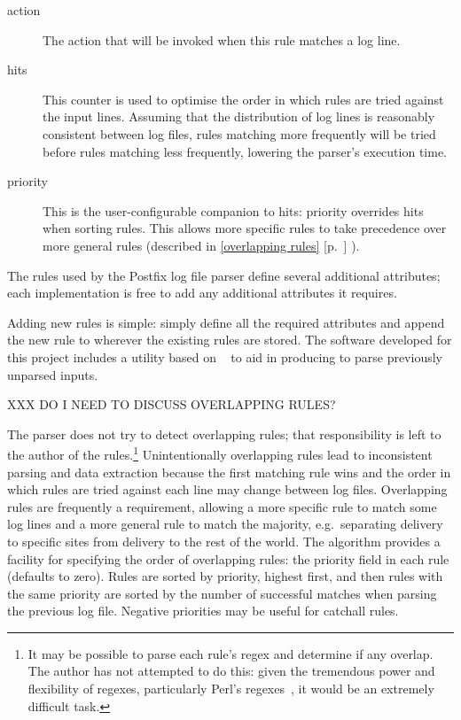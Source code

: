 \documentclass[draft]{svmult}
\newcommand{\refwithpage}[1]{%
    \empty{}\ref{#1} [p.~\pageref{#1}]%
}
\newcommand{\sectionref}[1]{%
    \textsection{}\refwithpage{#1}%
}
\begin{document}
\begin{description}
    \item [action] The action that will be invoked when this rule matches a
        log line.

    \item [hits] This counter is used to optimise the order in which rules
        are tried against the input lines.  Assuming that the distribution
        of log lines is reasonably consistent between log files, rules
        matching more frequently will be tried before rules matching less
        frequently, lowering the parser's execution time.

    \item [priority] This is the user-configurable companion to hits:
        priority overrides hits when sorting rules.  This allows more
        specific rules to take precedence over more general rules
        (described in \sectionref{overlapping rules}).

\end{description}

The rules used by the Postfix log file parser define several additional
attributes; each implementation is free to add any additional attributes it
requires.

Adding new rules is simple: simply define all the required attributes and
append the new rule to wherever the existing rules are stored.  The
software developed for this project includes a utility based on
\SLCT{}~\cite{slct-paper} to aid in producing \regexes{} to parse
previously unparsed inputs.

\label{overlapping rules}

XXX DO I NEED TO DISCUSS OVERLAPPING RULES\@?

The parser does not try to detect overlapping rules; that responsibility is
left to the author of the rules.\footnote{It may be possible to parse each
rule's regex and determine if any overlap.  The author has not attempted to
do this: given the tremendous power and flexibility of regexes,
particularly Perl's regexes~\cite{perlre}, it would be an extremely
difficult task.} Unintentionally overlapping rules lead to inconsistent
parsing and data extraction because the first matching rule wins and the
order in which rules are tried against each line may change between log
files.  Overlapping rules are frequently a requirement, allowing a more
specific rule to match some log lines and a more general rule to match the
majority, e.g.\ separating \SMTP{} delivery to specific sites from \SMTP{}
delivery to the rest of the world.  The algorithm provides a facility for
specifying the order of overlapping rules: the priority field in each rule
(defaults to zero).  Rules are sorted by priority, highest first, and then
rules with the same priority are sorted by the number of successful matches
when parsing the previous log file.  Negative priorities may be useful for
catchall rules.
\end{document}
